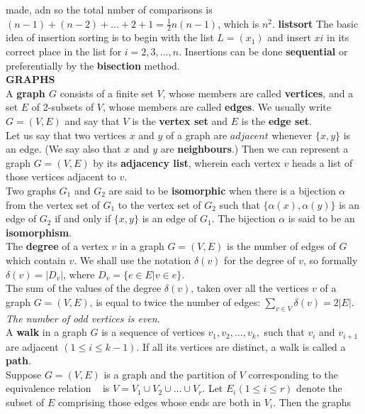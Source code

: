 \documentclass[10pt,landscape]{article}
\begin{document}
\begin{multicols}{4}
made, adn so the total nmber of comparisons is $(n-1)+(n-2)+ \dots + 2
+ 1 = \frac{1}{2}n(n-1)$, which is $n^{2}$.
\textbf{listsort} The basic idea of insertion sorting is to begin with
the list $L = (x_{1})$ and insert $x{i}$ in its correct place in the
list for $i = 2,3,\dots ,n$. Insertions can be done
\textbf{sequential} or preferentially by the \textbf{bisection}
method.\\
\textbf{GRAPHS}\\
A \textbf{graph $G$} consists of a finite set $V$, whose members are
called \textbf{vertices}, and a set $E$ of 2-subsets of $V$, whose
members are called \textbf{edges}. We usually write $G = (V,E)$ and
say that $V$ is the \textbf{vertex set} and $E$ is the \textbf{edge
  set}.\\
Let us say that two vertices $x$ and $y$ of a graph are $adjacent$
whenever $\{x,y\}$ is an edge. (We say also that $x$ and $y$ are
\textbf{neighbours}.) Then we can represent a graph $G = (V,E)$ by its
\textbf{adjacency list}, wherein each vertex $v$ heads a list of those
vertices adjacent to $v$.\\
Two graphs $G_{1}$ and $G_{2}$ are said to be \textbf{isomorphic} when
there is a bijection $\alpha$ from the vertex set of $G_{1}$ to the
vertex set of $G_{2}$ such that $\{\alpha(x), \alpha(y)\}$ is an edge
of $G_{2}$ if and only if $\{x, y\}$ is an edge of $G_{1}$. The
bijection $\alpha$ is said to be an \textbf{isomorphism}.\\
The \textbf{degree} of a vertex $v$ in a graph $G = (V,E)$ is the
number of edges of $G$ which contain $v$. We shall use the notation
$\delta(v)$ for the degree of $v$, so formally $\delta(v) = |D_{v}|$,
where $D_{v} = \{e \in E | v \in e \}$.\\
The sum of the values of the degree $\delta(v)$, taken over all the
vertices $v$ of a graph $G = (V,E)$, is equal to twice the number of
edges: $\displaystyle\sum_{v \in V} \delta(v) = 2|E|$.\\
\textit{The number of odd vertices is even}.\\
A \textbf{walk} in a graph $G$ is a sequence of vertices
$v_{1},v_{2},\dots , v_{k},$ such that $v_{i}$ and $v_{i+1}$ are
adjacent $(1 \leq i \leq k-1)$. If all its vertices are distinct, a
walk is called a \textbf{path}.\\
Suppose $G = (V,E)$ is a graph and the partition of $V$ corresponding
to the equivalence relation ~ is $V = V_{1} \cup V_{2} \cup \dots \cup
V_{r}$. Let $E_{i} (1 \leq i \leq r)$ denote the subset of $E$
comprising those edges whose ends are both in $V_{i}$. Then the graphs

\end{multicols}
\end{document}
